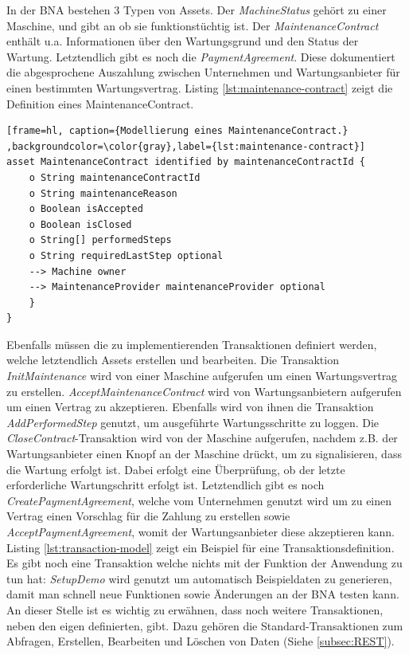In der BNA bestehen 3 Typen von Assets. Der \textit{MachineStatus} gehört zu einer Maschine, und gibt an ob sie funktionstüchtig ist. Der \textit{MaintenanceContract} enthält u.a. Informationen über den Wartungsgrund und den Status der Wartung. Letztendlich gibt es noch die \textit{PaymentAgreement}. Diese dokumentiert die abgesprochene Auszahlung zwischen Unternehmen und Wartungsanbieter für einen bestimmten Wartungsvertrag. Listing \ref{lst:maintenance-contract} zeigt die Definition eines MaintenanceContract.

\begin{lstfloat}
\begin{lstlisting}[frame=hl, caption={Modellierung eines MaintenanceContract.} ,backgroundcolor=\color{gray},label={lst:maintenance-contract}]
asset MaintenanceContract identified by maintenanceContractId {
    o String maintenanceContractId
    o String maintenanceReason
    o Boolean isAccepted
    o Boolean isClosed
    o String[] performedSteps
    o String requiredLastStep optional
    --> Machine owner
    --> MaintenanceProvider maintenanceProvider optional
    }
}
\end{lstlisting} 
\end{lstfloat}

Ebenfalls müssen die zu implementierenden Transaktionen definiert werden, welche letztendlich Assets erstellen und bearbeiten. Die Transaktion \textit{InitMaintenance} wird von einer Maschine aufgerufen um einen Wartungsvertrag zu erstellen. \textit{AcceptMaintenanceContract} wird von Wartungsanbietern aufgerufen um einen Vertrag zu akzeptieren. Ebenfalls wird von ihnen die Transaktion \textit{AddPerformedStep} genutzt, um ausgeführte Wartungsschritte zu loggen. Die \textit{CloseContract}-Transaktion wird von der Maschine aufgerufen, nachdem z.B. der Wartungsanbieter einen Knopf an der Maschine drückt, um zu signalisieren, dass die Wartung erfolgt ist. Dabei erfolgt eine Überprüfung, ob der letzte erforderliche Wartungschritt erfolgt ist. Letztendlich gibt es noch \textit{CreatePaymentAgreement}, welche vom Unternehmen genutzt wird um zu einen Vertrag einen Vorschlag für die Zahlung zu erstellen sowie \textit{AcceptPaymentAgreement}, womit der Wartungsanbieter diese akzeptieren kann. Listing \ref{lst:transaction-model} zeigt ein Beispiel für eine Transaktionsdefinition. Es gibt noch eine Transaktion welche nichts mit der Funktion der Anwendung zu tun hat: \textit{SetupDemo} wird genutzt um automatisch Beispieldaten zu generieren, damit man schnell neue Funktionen sowie Änderungen an der BNA testen kann. An dieser Stelle ist es wichtig zu erwähnen, dass noch weitere Transaktionen, neben den eigen definierten, gibt. Dazu gehören die Standard-Transaktionen zum Abfragen, Erstellen, Bearbeiten und Löschen von Daten (Siehe \ref{subsec:REST}).

